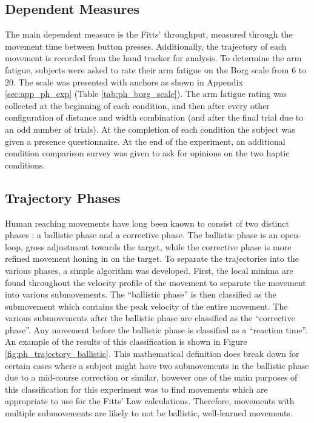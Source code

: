 \subsection{Dependent Measures}

The main dependent measure is the Fitts' throughput, measured through the movement time between button presses.
Additionally, the trajectory of each movement is recorded from the hand tracker for analysis.
To determine the arm fatigue, subjects were asked to rate their arm fatigue on the Borg scale from 6 to 20.
The scale was presented with anchors as shown in Appendix \ref{sec:app_ph_exp} (Table \ref{tab:ph_borg_scale}).
The arm fatigue rating was collected at the beginning of each condition, and then after every other configuration of distance and width combination (and after the final trial due to an odd number of trials).
At the completion of each condition the subject was given a presence questionnaire.
At the end of the experiment, an additional condition comparison survey was given to ask for opinions on the two haptic conditions.

\subsection{Trajectory Phases}
\label{sec:ph_traj_phases}

Human reaching movements have long been known to consist of two distinct phases \citep{woodworth_accuracy_1899}: a ballistic phase and a corrective phase.
The ballistic phase is an open-loop, gross adjustment towards the target, while the corrective phase is more refined movement honing in on the target.
To separate the trajectories into the various phases, a simple algorithm was developed.
First, the local minima are found throughout the velocity profile of the movement to separate the movement into various submovements.
The ``ballistic phase'' is then classified as the submovement which contains the peak velocity of the entire movement.
The various submovements after the ballistic phase are classified as the ``corrective phase''.
Any movement before the ballistic phase is classified as a ``reaction time''.
An example of the results of this classification is shown in Figure \ref{fig:ph_trajectory_ballistic}.
This mathematical definition does break down for certain cases where a subject might have two submovements in the ballistic phase due to a mid-course correction or similar, however one of the main purposes of this classification for this experiment was to find movements which are appropriate to use for the Fitts' Law calculations.
Therefore, movements with multiple submovements are likely to not be ballistic, well-learned movements.


